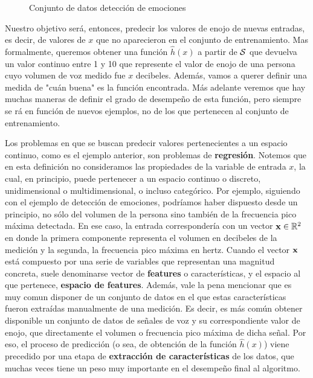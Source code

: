 \begin{figure}[h]
\centering
\caption{Conjunto de datos detección de emociones}
\label{fig:emotion detection dataset regression}
\end{figure}

Nuestro objetivo será, entonces, predecir los valores de enojo de nuevas entradas, es decir, de valores de $x$ que no aparecieron en el conjunto de entrenamiento. Mas formalmente, queremos obtener una función $\hat{h}(x)$ a partir de $\mathcal{S}$ que devuelva un valor continuo entre 1 y 10 que represente el valor de enojo de una persona cuyo volumen de voz medido fue $x$ decibeles. Además, vamos a querer definir una medida de "cuán buena" es la función encontrada. Más adelante  veremos que hay muchas maneras de definir el grado de desempeño de esta función, pero siempre se rá en función de nuevos ejemplos, no de los que pertenecen al conjunto de entrenamiento.

Los problemas en que se buscan predecir valores pertenecientes a un espacio continuo, como es el ejemplo anterior, son problemas de \textbf{regresión}. Notemos que en esta definición no consideramos las propiedades de la variable de entrada $x$, la cual, en principio, puede pertenecer a un espacio continuo o discreto, unidimensional o multidimensional, o incluso categórico. Por ejemplo, siguiendo con el ejemplo de detección de emociones, podríamos haber dispuesto desde un principio, no sólo del volumen de la persona sino también de la frecuencia pico máxima detectada. En ese caso, la entrada correspondería con un vector $\mathbf{x} \in \mathbb{R}^2$ en donde la primera componente representa el volumen en decibeles de la medición y la segunda, la frecuencia pico máxima en hertz. Cuando el vector $\mathbf{x}$ está compuesto por una serie de variables que representan una magnitud concreta, suele denominarse vector de \textbf{features} o características, y el espacio al que pertenece, \textbf{espacio de features}. Además, vale la pena mencionar que es muy comun disponer de un conjunto de datos en el que estas características fueron extraídas manualmente de una medición. Es decir, es más común obtener disponible un conjunto de datos de señales de voz y su correspondiente valor de enojo, que directamente el volumen o frecuencia pico máxima de dicha señal. Por eso, el proceso de predicción (o sea, de obtención de la función $\hat{h}(x)$) viene precedido por una etapa de \textbf{extracción de características} de los datos, que muchas veces tiene un peso muy importante en el desempeño final al algoritmo.


